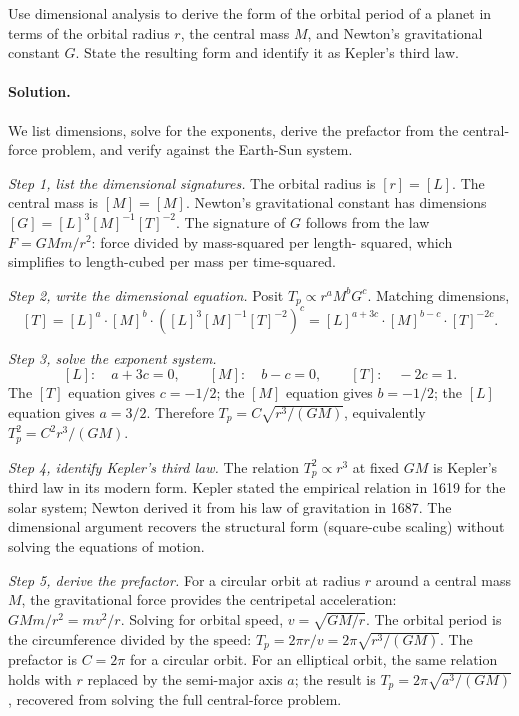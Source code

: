 \begin{exercise}
Use dimensional analysis to derive the form of the orbital period of
a planet in terms of the orbital radius $r$, the central mass $M$,
and Newton's gravitational constant $G$. State the resulting form
and identify it as Kepler's third law.

\paragraph{Solution.}
We list dimensions, solve for the exponents, derive the prefactor
from the central-force problem, and verify against the Earth-Sun
system.

\textit{Step 1, list the dimensional signatures.} The orbital radius
is $[r] = [L]$. The central mass is $[M] = [M]$. Newton's
gravitational constant has dimensions
$[G] = [L]^{3}[M]^{-1}[T]^{-2}$. The signature of $G$ follows from
the law $F = GMm/r^{2}$: force divided by mass-squared per length-
squared, which simplifies to length-cubed per mass per time-squared.

\textit{Step 2, write the dimensional equation.} Posit
$T_{p} \propto r^{a} M^{b} G^{c}$. Matching dimensions,
\[
[T] = [L]^{a} \cdot [M]^{b} \cdot ([L]^{3}[M]^{-1}[T]^{-2})^{c}
= [L]^{a+3c} \cdot [M]^{b-c} \cdot [T]^{-2c}.
\]

\textit{Step 3, solve the exponent system.}
\[
[L]: \quad a + 3c = 0, \qquad
[M]: \quad b - c = 0, \qquad
[T]: \quad -2c = 1.
\]
The $[T]$ equation gives $c = -1/2$; the $[M]$ equation gives
$b = -1/2$; the $[L]$ equation gives $a = 3/2$. Therefore
$T_{p} = C \sqrt{r^{3} / (GM)}$, equivalently
$T_{p}^{2} = C^{2} r^{3} / (GM)$.

\textit{Step 4, identify Kepler's third law.} The relation
$T_{p}^{2} \propto r^{3}$ at fixed $GM$ is Kepler's third law in its
modern form. Kepler stated the empirical relation in 1619 for the
solar system; Newton derived it from his law of gravitation in 1687.
The dimensional argument recovers the structural form (square-cube
scaling) without solving the equations of motion.

\textit{Step 5, derive the prefactor.} For a circular orbit at
radius $r$ around a central mass $M$, the gravitational force
provides the centripetal acceleration:
$G M m / r^{2} = m v^{2}/r$. Solving for orbital speed,
$v = \sqrt{GM/r}$. The orbital period is the circumference divided
by the speed: $T_{p} = 2\pi r / v = 2\pi \sqrt{r^{3}/(GM)}$. The
prefactor is $C = 2\pi$ for a circular orbit. For an elliptical
orbit, the same relation holds with $r$ replaced by the semi-major
axis $a$; the result is $T_{p} = 2\pi \sqrt{a^{3}/(GM)}$, recovered
from solving the full central-force problem.


\end{exercise}
